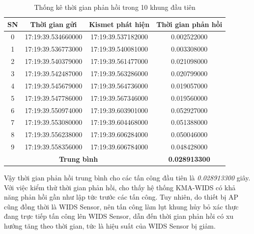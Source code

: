\begin{table}[H]
\centering
\small
\setlength{\extrarowheight}{1pt}
\caption{\label{tab:response-time-table}Thống kê thời gian phản hồi trong 10 khung đầu tiên}
\begin{tabular}{|c|c|c|c|}
\hline
\textbf{SN} & \textbf{Thời gian gửi} & \textbf{Kismet phát hiện} & \textbf{Thời gian phản hồi} \\ \hline
0           & 17:19:39.534660000     & 17:19:39.537182000        & 0.002522000                 \\ \hline
1           & 17:19:39.536773000     & 17:19:39.540081000        & 0.003308000                 \\ \hline
2           & 17:19:39.540379000     & 17:19:39.561477000        & 0.021098000                 \\ \hline
3           & 17:19:39.542487000     & 17:19:39.563286000        & 0.020799000                 \\ \hline
4           & 17:19:39.545679000     & 17:19:39.564736000        & 0.019057000                 \\ \hline
5           & 17:19:39.547786000     & 17:19:39.567346000        & 0.019560000                 \\ \hline
6           & 17:19:39.550974000     & 17:19:39.603901000        & 0.052927000                 \\ \hline
7           & 17:19:39.553080000     & 17:19:39.604468000        & 0.051388000                 \\ \hline
8           & 17:19:39.556238000     & 17:19:39.606284000        & 0.050046000                 \\ \hline
9           & 17:19:39.558356000     & 17:19:39.606784000        & 0.048428000                 \\ \hline
\multicolumn{3}{|c|}{\textbf{Trung bình}}                        & \textbf{0.028913300}        \\ \hline
\end{tabular}
\end{table}

Vậy thời gian phản hồi trung bình cho các tấn công đầu tiên là \emph{0.028913300} giây. Với việc kiểm thử thời gian phản hồi, cho thấy hệ thống KMA-WIDS có khả năng phản hồi gần như lập tức trước các tấn công. Tuy nhiên, do thiết bị AP cũng đồng thời là WIDS Sensor, nên tấn công làm lụt khung hủy bỏ xác thực đang trực tiếp tấn công lên WIDS Sensor, dẫn đến thời gian phản hồi có xu hướng tăng theo thời gian, tức là hiệu suất của WIDS Sensor bị giảm.

